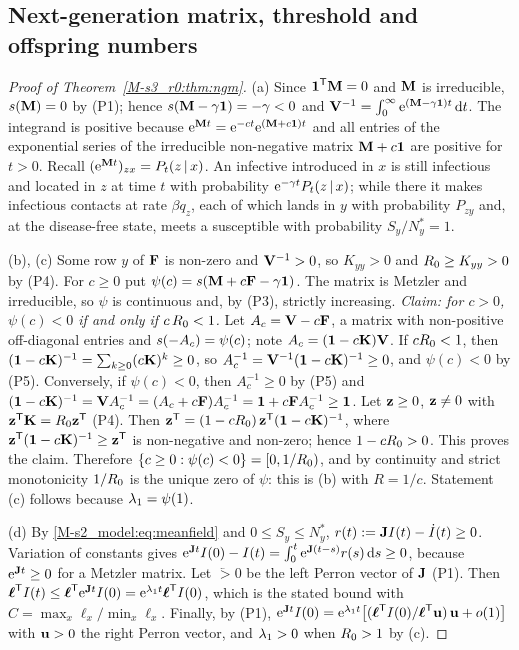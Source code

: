 \subsection{Next-generation matrix, threshold and offspring numbers}

\begin{proof}[Proof of Theorem~\ref{M-s3_r0:thm:ngm}]
  (a) Since $\boldsymbol{1}^{\mathsf{T}}\mathbf{M}=0$ and $\mathbf{M}$ is irreducible, $s(\mathbf{M})=0$ by (P1); hence
  $s(\mathbf{M}-\gamma\mathbf{1})=-\gamma<0$ and $\mathbf{V}^{-1}=\int_0^\infty\mathrm{e}^{(\mathbf{M}-\gamma\mathbf{1})t}\,\mathrm{d} t$.  The integrand is
  positive because $\mathrm{e}^{\mathbf{M} t}=\mathrm{e}^{-ct}\mathrm{e}^{(\mathbf{M}+c\mathbf{1})t}$ and all entries of the exponential series of the
  irreducible non-negative matrix $\mathbf{M}+c\mathbf{1}$ are positive for $t>0$.  Recall $(\mathrm{e}^{\mathbf{M} t})_{zx}=P_t(z\,|\,x)$.
  An infective introduced in $x$ is still infectious and located in $z$ at time $t$ with probability
  $\mathrm{e}^{-\gamma t}P_t(z\,|\,x)$; while there it makes infectious contacts at rate $\beta q_z$, each of which
  lands in $y$ with probability $P_{zy}$ and, at the disease-free state, meets a susceptible with probability
  $S_y/N^*_y=1$.

  (b), (c) Some row $y$ of $\mathbf{F}$ is non-zero and $\mathbf{V}^{-1}>0$, so $K_{yy}>0$ and $R_0\ge K_{yy}>0$ by (P4).
  For $c\ge0$ put $\psi(c)=s(\mathbf{M}+c\mathbf{F}-\gamma\mathbf{1})$.  The matrix is Metzler and irreducible, so $\psi$ is
  continuous and, by (P3), strictly increasing.  \emph{Claim: for $c>0$, $\psi(c)<0$ if and only if $c\,R_0<1$.}
  Let $A_c=\mathbf{V}-c\mathbf{F}$, a matrix with non-positive off-diagonal entries and $s(-A_c)=\psi(c)$; note
  $A_c=(\mathbf{1}-c\mathbf{K})\mathbf{V}$.  If $cR_0<1$, then $(\mathbf{1}-c\mathbf{K})^{-1}=\sum_{k\ge0}(c\mathbf{K})^k\ge0$, so
  $A_c^{-1}=\mathbf{V}^{-1}(\mathbf{1}-c\mathbf{K})^{-1}\ge0$, and $\psi(c)<0$ by (P5).  Conversely, if $\psi(c)<0$, then $A_c^{-1}\ge0$
  by (P5) and $(\mathbf{1}-c\mathbf{K})^{-1}=\mathbf{V} A_c^{-1}=(A_c+c\mathbf{F})A_c^{-1}=\mathbf{1}+c\mathbf{F} A_c^{-1}\ge\mathbf{1}$.  Let $\mathbf{z}\ge0$,
  $\mathbf{z}\ne0$ with $\mathbf{z}^{\mathsf{T}}\mathbf{K}=R_0\mathbf{z}^{\mathsf{T}}$ (P4).  Then
  $\mathbf{z}^{\mathsf{T}}=(1-cR_0)\,\mathbf{z}^{\mathsf{T}}(\mathbf{1}-c\mathbf{K})^{-1}$, where $\mathbf{z}^{\mathsf{T}}(\mathbf{1}-c\mathbf{K})^{-1}\ge\mathbf{z}^{\mathsf{T}}$ is
  non-negative and non-zero; hence $1-cR_0>0$.  This proves the claim.  Therefore
  $\{c\ge0:\psi(c)<0\}=[0,1/R_0)$, and by continuity and strict monotonicity $1/R_0$ is the unique zero of
  $\psi$: this is (b) with $R=1/c$.  Statement (c) follows because $\lambda_1=\psi(1)$.

  (d) By \eqref{M-s2_model:eq:meanfield} and $0\le S_y\le N^*_y$, $r(t):=\mathbf{J} I(t)-\dot I(t)\ge0$.  Variation of
  constants gives $\mathrm{e}^{\mathbf{J} t}I(0)-I(t)=\int_0^t\mathrm{e}^{\mathbf{J}(t-s)}r(s)\,\mathrm{d} s\ge0$, because $\mathrm{e}^{\mathbf{J} t}\ge0$ for a
  Metzler matrix.  Let $\lvec>0$ be the left Perron vector of $\mathbf{J}$ (P1).  Then
  $\boldsymbol{\ell}^{\mathsf{T}}I(t)\le\boldsymbol{\ell}^{\mathsf{T}}\mathrm{e}^{\mathbf{J} t}I(0)=\mathrm{e}^{\lambda_1 t}\boldsymbol{\ell}^{\mathsf{T}}I(0)$, which is the stated bound with
  $C=\max_x\ell_x/\min_x\ell_x$.  Finally, by (P1), $\mathrm{e}^{\mathbf{J} t}I(0)=\mathrm{e}^{\lambda_1 t}\bigl[(\boldsymbol{\ell}^{\mathsf{T}}I(0)/\boldsymbol{\ell}^{\mathsf{T}}\mathbf{u})\,\mathbf{u}+o(1)\bigr]$
  with $\mathbf{u}>0$ the right Perron vector, and $\lambda_1>0$ when $R_0>1$ by (c).
\end{proof}

